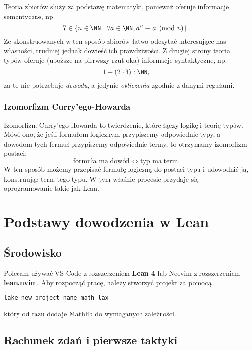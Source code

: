 \documentclass[polish,pretty]{angav}
\begin{document}
Teoria zbiorów służy za podstawę matematyki, ponieważ oferuje informacje semantyczne, np.
\[ 7 \in \left\{n \in \NN \mid \forall a \in \NN, a^n \equiv a \pmod{n} \right\}. \]
Ze skonstruowanych w ten sposób zbiorów łatwo odczytać interesujące nas własności, trudniej jednak dowieść ich prawdziwości.
Z drugiej strony teoria typów oferuje (uboższe na pierwszy rzut oka) informacje syntaktyczne, np.
\[ 1 + (2 \cdot 3) : \NN, \]
za to nie potrzebuje \emph{dowodu}, a jedynie \emph{obliczenia} zgodnie z danymi regułami.

\subsubsection*{Izomorfizm Curry'ego-Howarda}

Izomorfizm Curry'ego-Howarda to twierdzenie, które łączy logikę i teorię typów.
Mówi ono, że jeśli formułom logicznym przypiszemy odpowiednie typy, a dowodom tych formuł przypiszemy odpowiednie termy, to otrzymamy izomorfizm postaci:
\[ \text{formuła ma dowód} \iff \text{typ ma term}. \]
W ten sposób możemy przepisać formułę logiczną do postaci typu i udowodnić ją, konstruując term tego typu.
W tym właśnie procesie przydaje się oprogramowanie takie jak Lean.


\section{Podstawy dowodzenia w Lean}

\subsection{Środowisko}

Polecam używać VS Code z rozszerzeniem \textbf{Lean 4} lub Neovim z rozszerzeniem \textbf{lean.nvim}.
Aby rozpocząć pracę, należy stworzyć projekt za pomocą
\begin{verbatim}
lake new project-name math-lax
\end{verbatim}
który od razu dodaje Mathlib do wymaganych zależności.


\subsection{Rachunek zdań i pierwsze taktyki}
\end{document}
